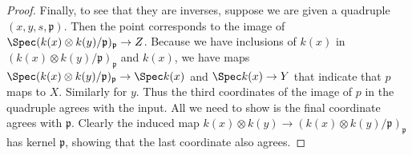 \begin{proof}
	Finally, to see that they are inverses, suppose we are given a quadruple $(x,y,s,\mathfrak{p}) $.
	Then the point corresponds to the image of $\Spec (k(x) \otimes k(y) / \mathfrak{p})_{\mathfrak{p}} \to Z $.
	Because we have inclusions of $k(x) $ in $(k(x) \otimes k(y) / \mathfrak{p})_{\mathfrak{p}}$ and $k(x) $, we have maps $\Spec (k(x) \otimes k(y) / \mathfrak{p})_{\mathfrak{p}} \to \Spec k(x)$ and $\Spec k(x) \to Y $ that indicate that $p $ maps to $X $.
	Similarly for $y$.
	Thus the third coordinates of the image of $p $ in the quadruple agrees with the input.
	All we need to show is the final coordinate agrees with $\mathfrak{p} $.
	Clearly the induced map $k(x) \otimes k(y) \to (k(x) \otimes k(y) / \mathfrak{p})_{\mathfrak{p}} $ has kernel $\mathfrak{p} $, showing that the last coordinate also agrees.
\end{proof}


